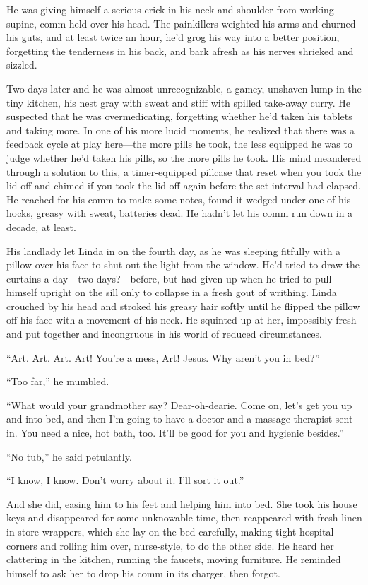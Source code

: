He was giving himself a serious crick in his neck and shoulder from
working supine, comm held over his head. The painkillers weighted
his arms and churned his guts, and at least twice an hour, he’d
grog his way into a better position, forgetting the tenderness in
his back, and bark afresh as his nerves shrieked and sizzled.

Two days later and he was almost unrecognizable, a gamey, unshaven
lump in the tiny kitchen, his nest gray with sweat and stiff with
spilled take-away curry. He suspected that he was overmedicating,
forgetting whether he’d taken his tablets and taking more. In one
of his more lucid moments, he realized that there was a feedback
cycle at play here—the more pills he took, the less equipped he was
to judge whether he’d taken his pills, so the more pills he took.
His mind meandered through a solution to this, a timer-equipped
pillcase that reset when you took the lid off and chimed if you
took the lid off again before the set interval had elapsed. He
reached for his comm to make some notes, found it wedged under one
of his hocks, greasy with sweat, batteries dead. He hadn’t let his
comm run down in a decade, at least.

His landlady let Linda in on the fourth day, as he was sleeping
fitfully with a pillow over his face to shut out the light from the
window. He’d tried to draw the curtains a day—two days?—before, but
had given up when he tried to pull himself upright on the sill only
to collapse in a fresh gout of writhing. Linda crouched by his head
and stroked his greasy hair softly until he flipped the pillow off
his face with a movement of his neck. He squinted up at her,
impossibly fresh and put together and incongruous in his world of
reduced circumstances.

“Art. Art. Art. Art! You’re a mess, Art! Jesus. Why aren’t you in
bed?”

“Too far,” he mumbled.

“What would your grandmother say? Dear-oh-dearie. Come on, let’s
get you up and into bed, and then I’m going to have a doctor and a
massage therapist sent in. You need a nice, hot bath, too. It’ll be
good for you and hygienic besides.”

“No tub,” he said petulantly.

“I know, I know. Don’t worry about it. I’ll sort it out.”

And she did, easing him to his feet and helping him into bed. She
took his house keys and disappeared for some unknowable time, then
reappeared with fresh linen in store wrappers, which she lay on the
bed carefully, making tight hospital corners and rolling him over,
nurse-style, to do the other side. He heard her clattering in the
kitchen, running the faucets, moving furniture. He reminded himself
to ask her to drop his comm in its charger, then forgot.

